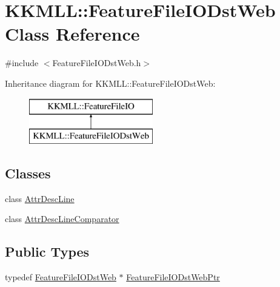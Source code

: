 \hypertarget{class_k_k_m_l_l_1_1_feature_file_i_o_dst_web}{}\section{K\+K\+M\+LL\+:\+:Feature\+File\+I\+O\+Dst\+Web Class Reference}
\label{class_k_k_m_l_l_1_1_feature_file_i_o_dst_web}


{\ttfamily \#include $<$Feature\+File\+I\+O\+Dst\+Web.\+h$>$}

Inheritance diagram for K\+K\+M\+LL\+:\+:Feature\+File\+I\+O\+Dst\+Web\+:\begin{figure}[H]
\begin{center}
\leavevmode
\includegraphics[height=2.000000cm]{class_k_k_m_l_l_1_1_feature_file_i_o_dst_web}
\end{center}
\end{figure}
\subsection*{Classes}
\begin{DoxyCompactItemize}
\item 
class \hyperlink{class_feature_file_i_o_dst_web_1_1_attr_desc_line}{Attr\+Desc\+Line}
\item 
class \hyperlink{class_feature_file_i_o_dst_web_1_1_attr_desc_line_comparator}{Attr\+Desc\+Line\+Comparator}
\end{DoxyCompactItemize}
\subsection*{Public Types}
\begin{DoxyCompactItemize}
\item 
typedef \hyperlink{class_k_k_m_l_l_1_1_feature_file_i_o_dst_web}{Feature\+File\+I\+O\+Dst\+Web} $\ast$ \hyperlink{class_k_k_m_l_l_1_1_feature_file_i_o_dst_web_a0be9243e024b5178e3a037517d1e37e3}{Feature\+File\+I\+O\+Dst\+Web\+Ptr}
\end{DoxyCompactItemize}
